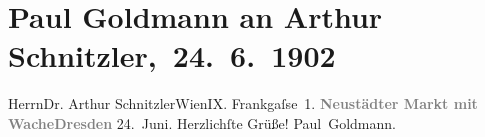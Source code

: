 

         \renewcommand{\erwaehnteOrte}{Orte: Blockhaus, Dresden, Frankgasse, Neustädter Markt, Wien}
         \renewcommand{\erwaehnteWerke}{}
               \section[ Paul Goldmann an Arthur Schnitzler, 24. 6. 1902]{ Paul Goldmann an Arthur Schnitzler, 24. 6. 1902}\nopagebreak{}\rehead{ }\begin{ledgroupsized}[t]{13cm}\normalsize\beginnumbering \toendnotes[C]{\smallbreak\pagebreak[2]} 
\pstart{}{\pb}Herrn\pend{}\pstart{}Dr. Arthur Schnitzler\pend{}\pstart{}Wien\pend{}\pstart{}IX. Frankgaſse 1.\pend{}{\bigskip}\pstart
           \noindent{}{\pb}\textcolor{gray}{\textbf{Neustädter Markt mit Wache}}\hfill \textcolor{gray}{\textbf{Dresden}}\pend
           \pstart
           \centering{}24. Juni.\pend
           \pstart
           Herzlichſte Grüße!\pend
           \pstart \spacefill\mbox{Paul Goldmann.}\pend{}
         
         \endnumbering{}\end{ledgroupsized}  \newcommand{\dateiname}{L03212}\newcommand{\titel}{Paul Goldmann an Arthur Schnitzler, 24. 6. 1902}\newcommand{\editorInnen}{Martin Anton Müller und Laura Untner}
      